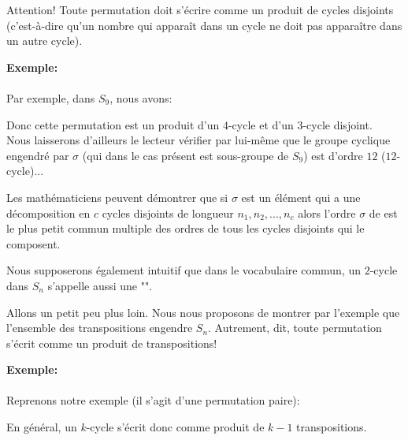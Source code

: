 \begin{enumerate}
		Attention! Toute permutation doit s'écrire comme un produit de cycles disjoints (c'est-à-dire qu'un nombre qui apparaît dans un cycle ne doit pas apparaître dans un autre cycle).
		
		\begin{tcolorbox}[colframe=black,colback=white,sharp corners]
		\textbf{{\Large {}}Exemple:}\\\\
		Par exemple, dans $S_9$, nous avons:
		
		Donc cette permutation est un produit d'un $4$-cycle et d'un $3$-cycle disjoint.\\
		
		Nous laisserons d'ailleurs le lecteur vérifier par lui-même que le groupe cyclique engendré par $\sigma$ (qui dans le cas présent est sous-groupe de $S_9$) est d'ordre $12$ ($12$-cycle)...
		\end{tcolorbox}
		\begin{tcolorbox}[title=Remarque,colframe=black,arc=10pt]
		Les mathématiciens peuvent démontrer que si $\sigma$ est un élément qui a une décomposition en $c$ cycles disjoints de longueur $n_1,n_2,...,n_c$ alors l'ordre $\sigma$ de est le plus petit commun multiple des ordres de tous les cycles disjoints qui le composent.
		\end{tcolorbox}	
	\end{enumerate} 
	Nous supposerons également intuitif que dans le vocabulaire commun, un $2$-cycle dans $S_n$ s'appelle aussi une "".
	
	Allons un petit peu plus loin. Nous nous proposons de montrer par l'exemple que l'ensemble des transpositions engendre $S_n$. Autrement, dit, toute permutation s'écrit comme un produit de transpositions!
	
	\begin{tcolorbox}[colframe=black,colback=white,sharp corners]
	\textbf{{\Large {}}Exemple:}\\\\
	Reprenons notre exemple (il s'agit d'une permutation paire):
		
	\end{tcolorbox}
	En général, un $k$-cycle s'écrit donc comme produit de $k-1$ transpositions.
	
